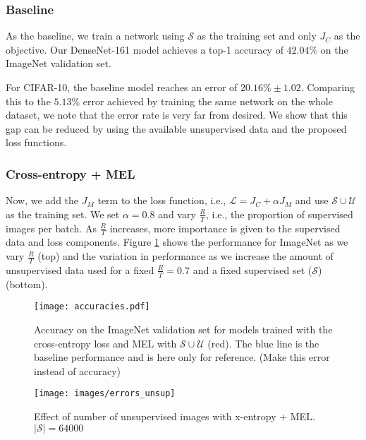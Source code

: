 \subsubsection{Baseline}
As the baseline, we train a network using $\mathcal{S}$ as the training set and only $J_C$ as the
objective. Our DenseNet-161 model achieves a top-1 accuracy of $42.04\%$ on the ImageNet validation
set. 

For CIFAR-10, the baseline model reaches an error of $20.16\% \pm 1.02$. Comparing this to the $5.13\%$
error achieved by training the same network on the whole dataset, we note that the error rate is
very far from desired. We show that this gap can be reduced by using the available unsupervised data and
the proposed loss functions.  

\subsubsection{Cross-entropy + MEL}
Now, we add the $J_M$ term to the loss function, i.e., $\mathcal{L} = J_C + \alpha
J_M$ and use $\mathcal{S} \cup \mathcal{U}$ as the training set. We set $\alpha = 0.8$ and vary
$\frac{R}{T}$, i.e., the proportion of supervised images per batch. As $\frac{R}{T}$ increases, more
importance is given to the supervised data and loss components. Figure \ref{fig:acc} shows
the performance for ImageNet as we vary $\frac{R}{T}$ (top) and the variation in performance as we
increase the amount of unsupervised data used for a fixed $\frac{R}{T} = 0.7$ and a fixed supervised
set ($\mathcal{S}$) (bottom). 
\begin{figure}
	\centering
		\texttt{[image: accuracies.pdf]}
		\caption{Accuracy on the ImageNet validation set for models trained with the cross-entropy
		loss and MEL with $\mathcal{S}\cup\mathcal{U}$ (red). The blue line is the baseline
	performance and is here only for reference. (Make this error instead of accuracy)}
		\label{fig:acc}
\end{figure}


\begin{figure}
	\centering
	\texttt{[image: images/errors\_unsup]}
	\caption{Effect of number of unsupervised images with x-entropy + MEL. $|\mathcal{S}|	=
	64000$}
	\label{fig:err_unsup}
\end{figure}


